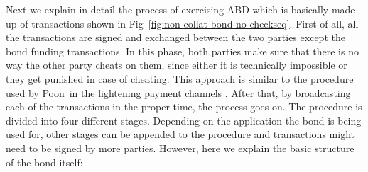 
Next we explain in detail the process of exercising ABD which is basically made up of transactions shown in Fig~\ref{fig:non-collat-bond-no-checkseq}. First of all, all the transactions are signed and exchanged between the two parties except the bond funding transactions. In this phase, both parties make sure that there is no way the other party cheats on them, since either it is technically impossible or they get punished in case of cheating. This approach is similar to the procedure used by Poon~\etal in the lightening payment channels \cite{poon2016bitcoin}. After that, by broadcasting each of the transactions in the proper time, the process goes on. The procedure is divided into four different stages. Depending on the application the bond is being used for, other stages can be appended to the procedure and transactions might need to be signed by more parties. However, here we explain the basic structure of the bond itself: 
